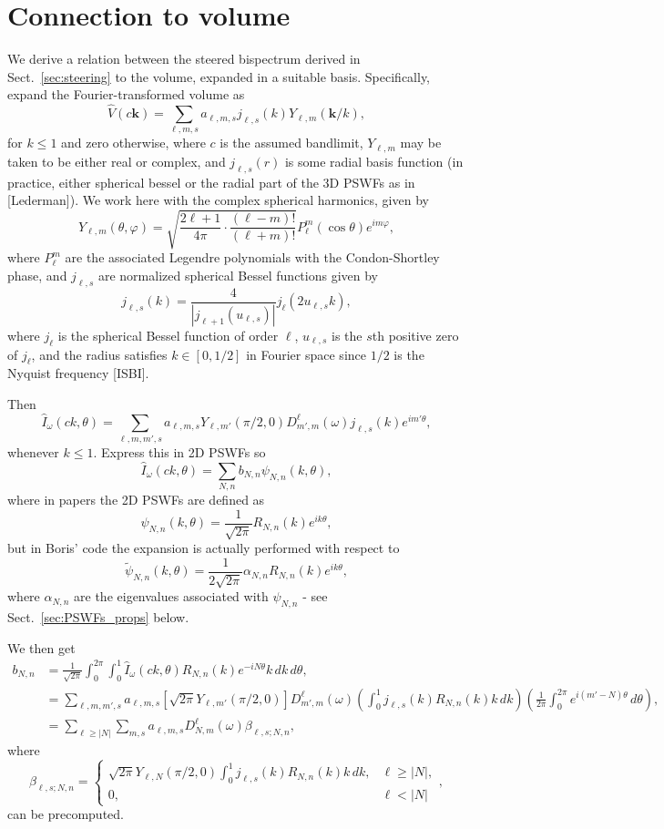 \documentclass[english,11pt]{article}
\newcommand{\1}{\mathbf{1}}
\newcommand{\kk}{\textbf{k}}
\numberwithin{equation}{section}
\theoremstyle{plain}
\theoremstyle{definition}
\theoremstyle{remark}
\theoremstyle{plain}
\theoremstyle{remark}
\theoremstyle{plain}
\theoremstyle{plain}
\begin{document}
\section{Connection to volume}

We derive a relation between the steered bispectrum derived in Sect.~\ref{sec:steering} to the volume, expanded in a suitable basis. Specifically, expand the Fourier-transformed volume as
\[ \widehat V(c\kk) = \sum_{\ell,m,s}a_{\ell,m,s}j_{\ell,s}(k)Y_{\ell,m}(\kk/k),\]
for $k\leq 1$ and zero otherwise, where $c$ is the assumed bandlimit, $Y_{\ell,m}$ may be taken to be either real or complex, and $j_{\ell,s}(r)$ is some radial basis function (in practice, either spherical bessel or the radial part of the 3D PSWFs as in [Lederman]). We work here with the complex spherical harmonics, given by
\[ Y_{\ell,m}(\theta,\varphi) = \sqrt{\frac{2\ell+1}{4\pi}\cdot\frac{(\ell-m)!}{(\ell+m)!}}P_{\ell}^m(\cos\theta)e^{i m\varphi},\]
where $P_{\ell}^m$ are the associated Legendre polynomials with the Condon-Shortley phase, and $j_{\ell,s}$ are normalized spherical Bessel functions given by
\[ j_{\ell, s}(k) = \frac{4}{|j_{\ell+1}(u_{\ell, s})|}j_{\ell}(2u_{\ell,s} k),\]
where $j_{\ell}$ is the spherical Bessel function of order $\ell$, $u_{\ell,s}$ is the $s$th positive zero of $j_{\ell}$, and the radius satisfies $k\in[0,1/2]$ in Fourier space since $1/2$ is the Nyquist frequency [ISBI].

Then
\[ \widehat I_{\omega}(ck,\theta) = \sum_{\ell,m,m',s}a_{\ell,m,s}Y_{\ell,m'}(\pi/2,0)D_{m',m}^{\ell}(\omega)j_{\ell,s}(k)e^{im'\theta},\]
whenever $k\leq 1$. Express this in 2D PSWFs so
\[ \widehat I_{\omega}(ck,\theta) = \sum_{N,n}b_{N,n}\psi_{N,n}(k,\theta),\]
where in papers the 2D PSWFs are defined as
\[ \psi_{N,n}(k,\theta) = \frac{1}{\sqrt{2\pi}}R_{N,n}(k)e^{ik\theta},\]
but in Boris' code the expansion is actually performed with respect to
\[ \widetilde\psi_{N,n}(k,\theta) = \frac{1}{2\sqrt{2\pi}}\alpha_{N,n}R_{N,n}(k)e^{ik\theta},\]
where $\alpha_{N,n}$ are the eigenvalues associated with $\psi_{N,n}$ - see Sect.~\ref{sec:PSWFs_props} below. 

We then get
\[\begin{aligned} b_{N,n} &= \frac{1}{\sqrt{2\pi}}\int_0^{2\pi}\int_0^1\widehat I_{\omega}(ck,\theta)R_{N,n}(k)e^{-iN\theta}k\, dk\, d\theta,\\
&= \sum_{\ell,m,m',s}a_{\ell,m,s}[\sqrt{2\pi}Y_{\ell,m'}(\pi/2,0)]D_{m',m}^{\ell}(\omega)\left(\int_0^1j_{\ell,s}(k)R_{N,n}(k)k\, dk\right)\left(\frac{1}{2\pi}\int_0^{2\pi}e^{i(m'-N)\theta}\, d\theta\right),\\
&= \sum_{\ell\geq |N|}\sum_{m,s}a_{\ell,m,s}D_{N,m}^{\ell}(\omega)\beta_{\ell,s;N,n},\end{aligned}\]
where
\[ \beta_{\ell,s;N,n} = \left\{\begin{array}{ll} \sqrt{2\pi}Y_{\ell,N}(\pi/2,0)\int_0^1j_{\ell,s}(k)R_{N,n}(k)k\, dk, & \ell\geq |N|,\\ 0, & \ell<|N|\end{array}\right.,\]
can be precomputed.
\end{document}

